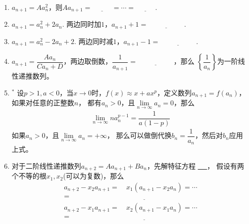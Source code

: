 \documentclass{article}
\newif\ifte
\begin{document}
\begin{multicols}{2}
\begin{enumerate}[leftmargin=20pt]
\item $ a_{n+1}=Aa_n^2 $，则$ Aa_{n+1}=\underline{\ \ifte 
(Aa_{n})^2 \else \hspace{1cm} \fi\ }=\cdots=\underline{\ \ifte
(Aa_1)^{2^{n}} \else \hspace{1cm} \fi\ } $. 

\item $ a_{n+1}=a_n^2+2a_n $. 两边同时加$ 1 $，$ a_{n+1}+1=
\underline{\ \ifte (a_n+1)^2\else \hspace{2cm} \fi\ } $.

\item $ a_{n+1}=a_n^2-2a_n+2 $. 两边同时减$ 1 $，$ a_{n+1}-1=
\underline{\ \ifte (a_n-1)^2\else \hspace{2cm} \fi\ } $.

\item $ a_{n+1}=\dfrac{Aa_n}{Ca_n+D} $，两边取倒数，$ 
\dfrac{1}{a_{n+1}}=\underline{\ \ifte \dfrac{D}{A}\dfrac{1}{a_n}
    +\dfrac{C}{A}\else \hspace{2cm} \fi\ }$，那么
$ \left\{ \dfrac{1}{a_n}\right\} $为一阶线性递推数列。

\item $^*$ 设$ p>1,a<0 $，当$ x\to 0 $时，$ f(x)\approx 
x+ax^p $，定义数列$ a_{n+1}=f(a_n) $，如果对任意的正整数$ n $，
都有$ a_n>0 $，且$ \lim\limits_{n\to\infty}a_n=0 $，那么
\begin{align*}
    \lim\limits_{n\to\infty}na_n^{p-1}=\dfrac{1}{a(1-p)}
\end{align*}
如果$ a_n>0 $，且$ \lim\limits_{n\to\infty}a_n=+\infty $，
那么可以做倒代换$ b_n=\dfrac{1}{a_n} $，然后对$ b_n $应用上式。

\item 对于二阶线性递推数列$ a_{n+2}=Aa_{n+1}+Ba_n $，先解特征方程
\underline{\ \ifte $ x^2=Ax+B $\else \hspace{2cm} \fi\ }，
假设有两个不等的根$ x_1,x_2 $(可以为复数)，那么
\begin{align*}
    a_{n+2}-x_2a_{n+1}=&\ x_1(a_{n+1}-x_2a_{n})=\cdots \\
    =&\ \underline{\ \ifte x_1^{n}(a_{2}-x_2a_{1})
        \else \hspace{2cm} \fi\ }		\\
    a_{n+2}-x_1a_{n+1}=&\ x_2(a_{n+1}-x_1a_{n})=\cdots \\
    =&\ \underline{\ \ifte x_2^{n}(a_{2}-x_1a_{1})
        \else \hspace{2cm} \fi\ }        
\end{align*}


\end{enumerate}
\end{multicols}
\end{document}
